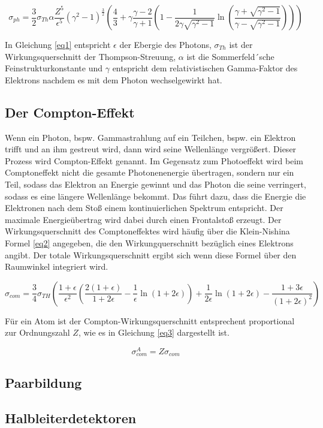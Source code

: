 \begin{equation}
    \sigma_{ph} = \frac{3}{2} \sigma_{Th} \alpha \frac{Z^5}{\epsilon^5} (\gamma^2 -1)^{\frac{3}{2}} \left(\frac{4}{3} + \gamma\frac{\gamma -2}{\gamma+1} \left(1 - \frac{1}{2 \gamma \sqrt{\gamma^2 -1}} \ln\left(\frac{\gamma + \sqrt{\gamma^2 - 1}}{\gamma - \sqrt{\gamma^2 -1}} \right) \right) \right)
    \label{eq1}
\end{equation}

In Gleichung \ref{eq1} entspricht $\epsilon$ der Ebergie des Photons, $\sigma_{Th}$
ist der Wirkungsquerschnitt der Thompson-Streuung, $\alpha$ ist die 
Sommerfeld´sche Feinstrukturkonstante und $\gamma$ entspricht dem relativistischen 
Gamma-Faktor des Elektrons nachdem es mit dem Photon wechselgewirkt hat.

\subsection{Der Compton-Effekt}
Wenn ein Photon, bspw. Gammastrahlung auf ein Teilchen, bspw. ein Elektron trifft
und an ihm gestreut wird, dann wird seine Wellenlänge vergrößert. 
Dieser Prozess wird Compton-Effekt genannt.
Im Gegensatz zum Photoeffekt wird beim Comptoneffekt nicht die 
gesamte Photonenenergie übertragen, sondern nur ein Teil, sodass das Elektron an 
Energie gewinnt und das Photon die seine verringert, sodass es eine längere 
Wellenlänge bekommt. Das führt dazu, dass die Energie die Elektronen nach dem 
Stoß einem kontinuierlichen Spektrum entspricht.
Der maximale Energieübertrag wird dabei durch einen Frontalstoß erzeugt.
Der Wirkungsquerschnitt des Comptoneffektes wird häufig über die 
Klein-Nishina Formel \ref{eq2} angegeben, die den Wirkungquerschnitt bezüglich 
eines Elektrons angibt. Der totale Wirkungsquerschnitt ergibt sich wenn diese 
Formel über den Raumwinkel integriert wird.

\begin{equation}
    \sigma_{com} = \frac{3}{4}\sigma_{TH} \left(\frac{1 + \epsilon}{\epsilon^2} \left(\frac{2(1+\epsilon)}{1+2\epsilon} - \frac{1}{\epsilon} \ln(1+2\epsilon) \right) + \frac{1}{2\epsilon} \ln(1+2\epsilon) - \frac{1+3\epsilon}{(1+2\epsilon)^2} \right)
    \label{eq2}
\end{equation}

Für ein Atom ist der Compton-Wirkungsquerschnitt entsprechent proportional zur 
Ordnungszahl $Z$, wie es in Gleichung \ref{eq3} dargestellt ist.

\begin{equation}
    \sigma^A_{com} = Z \sigma_{com}
\end{equation}

\subsection{Paarbildung}


\subsection{Halbleiterdetektoren}

\cite{sample}
